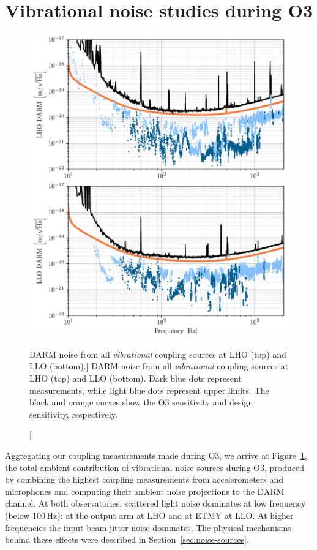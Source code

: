 \section{Vibrational noise studies during O3}\label{sec:vib}

\begin{figure}
	\centering
	\includegraphics{figures/noise-studies/vib-ambient.pdf}
	\caption
	[DARM noise from all \textit{vibrational} coupling sources at LHO (top) and LLO (bottom).]
	{DARM noise from all \textit{vibrational} coupling sources at LHO (top) and LLO (bottom).
	 Dark blue dots represent measurements, while light blue dots represent upper limits.
	 The black and orange curves show the O3 sensitivity and design sensitivity, respectively.
	 }
	\label{fig:vib-ambient}
\end{figure}

Aggregating our coupling measurements made during O3, we arrive at
Figure~\ref{fig:vib-ambient}, the total ambient contribution of vibrational noise sources during \ac{O3}, produced by combining the highest coupling measurements from accelerometers and microphones and computing their ambient noise projections to the DARM channel.
At both observatories, scattered light noise dominates at low frequency (below 100\,Hz): at the output arm at LHO and at ETMY at LLO.
At higher frequencies the input beam jitter noise dominates.
The physical mechanisms behind these effects were described in Section~\ref{sec:noise-sources}.


